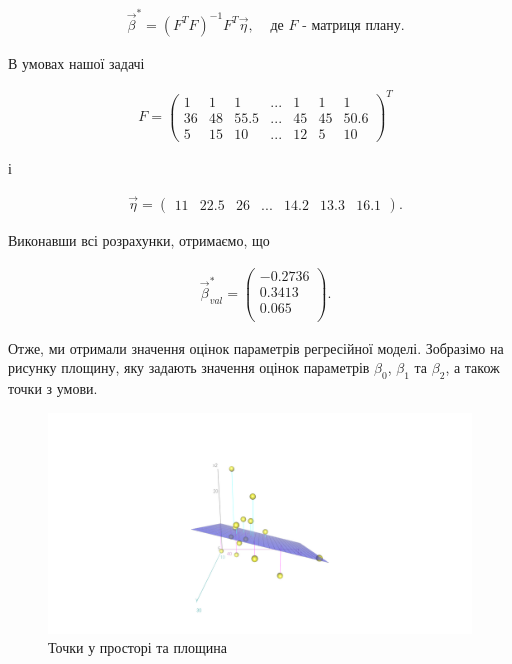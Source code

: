 \documentclass[14pt,a4paper]{scrartcl}
\theoremstyle{definition}
\theoremstyle{remark}
\theoremstyle{definition}
\theoremstyle{definition}
\begin{document}
\begin{align*}
  & \vec{\beta}^{*} = (F^{T}F)^{-1}F^{T}\vec{\eta}, &\text{  де  } F \text{ - матриця плану.}
\end{align*}

В умовах нашої задачі

\begin{align*}
  & F = \begin{pmatrix}
    1 & 1 & 1 & ... & 1 & 1 & 1 \\
    36 & 48 & 55.5 & ... & 45 & 45 & 50.6 \\
    5 & 15 & 10 & ... & 12 & 5 & 10
  \end{pmatrix}^{T}
\end{align*}

і

\begin{align*}
  & \vec{\eta} =\begin{pmatrix}
    11 & 22.5 & 26 & ... & 14.2 & 13.3 & 16.1
  \end{pmatrix}.
\end{align*}

Виконавши всі розрахунки, отримаємо, що

\begin{align*}
  & \vec{\beta}^{*}_ {val} = \begin{pmatrix}
    -0.2736  \\
    0.3413  \\
    0.065 \\
  \end{pmatrix}.
\end{align*}

Отже, ми отримали значення оцінок параметрів регресійної моделі. Зобразімо на рисунку площину, яку задають значення оцінок параметрів $\beta_{0}$, $\beta_{1}$ та $\beta_{2}$, а також точки з умови.

\begin{figure}[H]
  \includegraphics[width=\linewidth]{Plot3d.png}
  \caption{Точки у просторі та площина}
  \label{fig:image4}
\end{figure}
\end{document}
